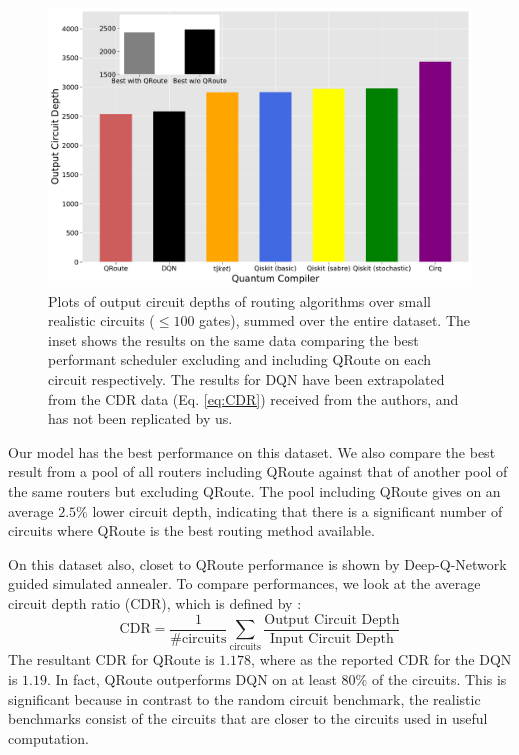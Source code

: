 \documentclass[%
 reprint,
amsmath,amssymb,
pra,
]{revtex4-2}
\begin{document}
\begin{figure}[t]
    \includegraphics[width=\linewidth]{images/realistic_small_benchmark.pdf}
    \caption{\label{fig:results-small}
        Plots of output circuit depths of routing algorithms over small realistic circuits ($\leq 100$ gates), summed over the entire dataset. The inset shows the results on the same data comparing the best performant scheduler excluding and including QRoute on each circuit respectively. The results for DQN have been extrapolated from the CDR data (Eq. \ref{eq:CDR}) received from the authors, and has not been replicated by us.}
\end{figure}

Our model has the best performance on this dataset. We also compare the best result from a pool of all routers including QRoute against that of another pool of the same routers but excluding QRoute. The pool including QRoute gives on an average $2.5\%$ lower circuit depth, indicating that there is a significant number of circuits where QRoute is the best routing method available.

On this dataset also, closet to QRoute performance is shown by  Deep-Q-Network guided simulated annealer. To compare performances, we look at the average circuit depth ratio (CDR), which is defined by \citep{qroute_dqn2}:
\begin{equation}
    \text{CDR} = \frac{1}{\textrm{\#circuits}} \sum_{\textrm{circuits}} \frac{\textrm{Output Circuit Depth}}{\textrm{Input Circuit Depth}}
    \label{eq:CDR}
\end{equation}
The resultant CDR for QRoute is $1.178$, where as the reported CDR for the DQN is $1.19$. In fact, QRoute outperforms DQN on at least $80\%$ of the circuits. This is significant because in contrast to the random circuit benchmark, the realistic benchmarks consist of the circuits that are closer to the circuits used in useful computation.
\end{document}
